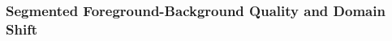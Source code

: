 %
%
%
\subsubsection{Segmented Foreground-Background Quality and Domain Shift}
\label{sec:suppmat-fgbgqualds}

